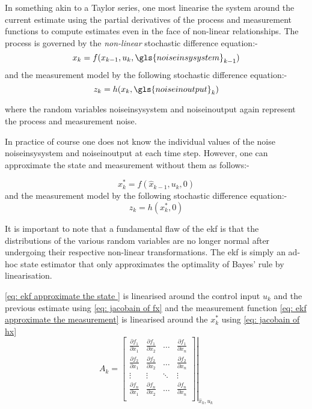 In something akin to a Taylor series, one most linearise the system around the current
estimate using the partial derivatives of the process and measurement functions to
compute estimates even in the face of non-linear relationships. The process is governed by the \textit{non-linear} stochastic difference equation:-
\begin{equation}
x_k = f(x_{k-1},u_k,\gls{noiseinsysystem}_{k-1})
\end{equation}
and the measurement model by the following stochastic difference equation:-
\begin{equation}
z_k = h(x_k,\gls{noiseinoutput}_k)
\end{equation}

where the random variables \gls{noiseinsysystem} and \gls{noiseinoutput} again represent the process and measurement
noise.



In practice of course one does not know the individual values of the noise \gls{noiseinsysystem} and \gls{noiseinoutput}  at
each time step. However, one can approximate the state and measurement  without
them as follows:-

\begin{equation}
x_k^* = f(\hat{x}_{k-1},u_k,0) \label{eq: ekf approximate the state }
\end{equation}
and the measurement model by the following stochastic difference equation:-
\begin{equation}
z_k = h(x_k^*,0)  \label{eq: ekf approximate the measurement}
\end{equation}

It is important to note that a fundamental flaw of the \gls{ekf} is that the distributions of the various random variables are no longer normal
after undergoing their respective non-linear transformations. The \gls{ekf} is simply an ad-hoc
state estimator that only approximates the optimality of Bayes’ rule by linearisation.


\eqref{eq: ekf approximate the state } is linearised around the control input $u_k$ and the previous estimate using \eqref{eq: jacobain of fx} and the measurement function \eqref{eq: ekf approximate the measurement} is linearised around the $x_k^*$  using  \eqref{eq: jacobain of hx}
\begin{equation}
A_k=\left.\left[\begin{array}{cccc}
\frac{\partial f_{1}}{\partial x_1} &\frac{\partial f_{1}}{\partial x_2} &\dots& \frac{\partial f_{1}}{\partial x_n}\\
\frac{\partial f_{2}}{\partial x_1} &\frac{\partial f_{2}}{\partial x_2} &\dots& \frac{\partial f_{2}}{\partial x_n}\\
\vdots& \vdots& \ddots &\vdots\\
\frac{\partial f_{n}}{\partial x_1} &\frac{\partial f_{n}}{\partial x_2} &\dots&\frac{\partial f_{n}}{\partial x_n} \\
\end{array}\right]\right|_{\hat{x}_k,u_k} \label{eq: jacobain of fx}
\end{equation}

